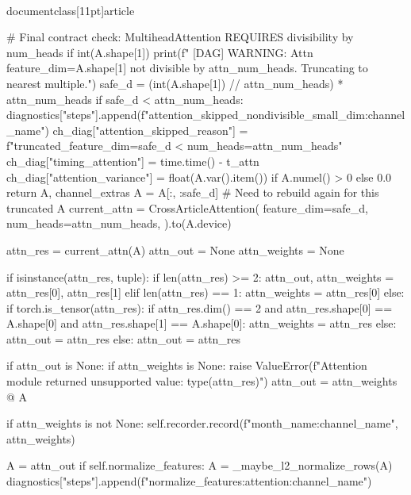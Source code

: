 \\documentclass[11pt]{article}
\begin{document}
\begin{CodeBlock}
                # Final contract check: MultiheadAttention REQUIRES divisibility by num_heads
                if int(A.shape[1]) %
                    print(f"      [DAG] WARNING: Attn feature_dim={A.shape[1]} not divisible by {attn_num_heads}. Truncating to nearest multiple.")
                    safe_d = (int(A.shape[1]) // attn_num_heads) * attn_num_heads
                    if safe_d < attn_num_heads:
                        diagnostics["steps"].append(f"attention_skipped_nondivisible_small_dim:{channel_name}")
                        ch_diag["attention_skipped_reason"] = f"truncated_feature_dim={safe_d} < num_heads={attn_num_heads}"
                        ch_diag["timing_attention"] = time.time() - t_attn
                        ch_diag["attention_variance"] = float(A.var().item()) if A.numel() > 0 else 0.0
                        return A, channel_extras
                    A = A[:, :safe_d]
                    # Need to rebuild again for this truncated A
                    current_attn = CrossArticleAttention(
                        feature_dim=safe_d,
                        num_heads=attn_num_heads,
                    ).to(A.device)
                
                attn_res = current_attn(A)
                attn_out = None
                attn_weights = None

                if isinstance(attn_res, tuple):
                    if len(attn_res) >= 2:
                        attn_out, attn_weights = attn_res[0], attn_res[1]
                    elif len(attn_res) == 1:
                        attn_weights = attn_res[0]
                else:
                    if torch.is_tensor(attn_res):
                        if attn_res.dim() == 2 and attn_res.shape[0] == A.shape[0] and attn_res.shape[1] == A.shape[0]:
                            attn_weights = attn_res
                        else:
                            attn_out = attn_res
                    else:
                        attn_out = attn_res

                if attn_out is None:
                    if attn_weights is None:
                        raise ValueError(f"Attention module returned unsupported value: {type(attn_res)}")
                    attn_out = attn_weights @ A

                if attn_weights is not None:
                    self.recorder.record(f"{month_name}:{channel_name}", attn_weights)

                A = attn_out
                if self.normalize_features:
                    A = _maybe_l2_normalize_rows(A)
                    diagnostics["steps"].append(f"normalize_features:attention:{channel_name}")


\end{CodeBlock}
\end{document}
